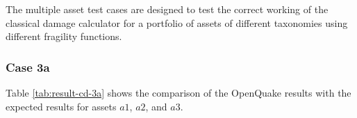The multiple asset test cases are designed to test the correct working of the classical damage calculator for a portfolio of assets of different taxonomies using different fragility functions.

\subsubsection{Case 3a}


Table \ref{tab:result-cd-3a} shows the comparison of the OpenQuake results with the expected results for assets $a1$, $a2$, and $a3$.